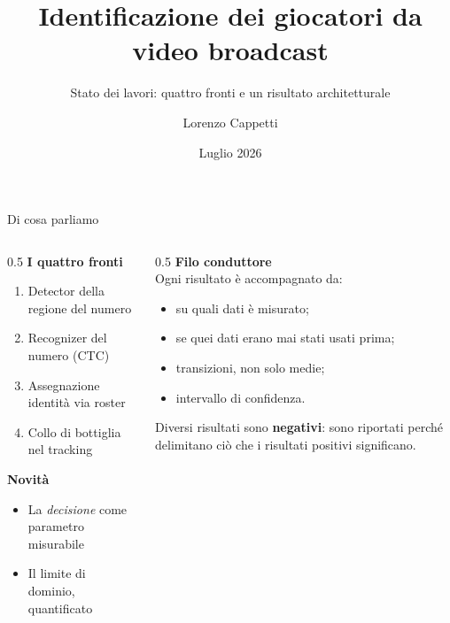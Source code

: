 \documentclass[aspectratio=169,10pt]{beamer}
\title{Identificazione dei giocatori da video broadcast}
\subtitle{Stato dei lavori: quattro fronti e un risultato architetturale}
\author{Lorenzo Cappetti}
\date{Luglio 2026}
\begin{document}
\begin{frame}
  \titlepage
\end{frame}

\begin{frame}{Di cosa parliamo}
  \begin{columns}[T]
    \begin{column}{0.5\textwidth}
      \textbf{I quattro fronti}
      \begin{enumerate}
        \item Detector della regione del numero
        \item Recognizer del numero (CTC)
        \item Assegnazione identità via roster
        \item Collo di bottiglia nel tracking
      \end{enumerate}
      \vspace{1em}
      \textbf{Novità}
      \begin{itemize}
        \item La \emph{decisione} come parametro misurabile
        \item Il limite di dominio, quantificato
      \end{itemize}
    \end{column}
    \begin{column}{0.5\textwidth}
      \small
      \textbf{Filo conduttore}\\[0.4em]
      Ogni risultato è accompagnato da:
      \begin{itemize}\small
        \item su quali dati è misurato;
        \item se quei dati erano mai stati usati prima;
        \item transizioni, non solo medie;
        \item intervallo di confidenza.
      \end{itemize}
      \vspace{0.8em}
      Diversi risultati sono \textbf{negativi}: sono riportati perché
      delimitano ciò che i risultati positivi significano.
    \end{column}
  \end{columns}
\end{frame}
\end{document}
